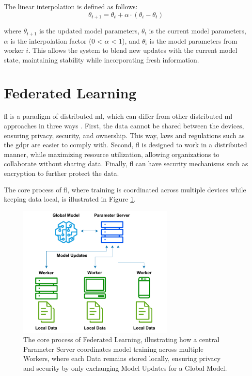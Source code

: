 The linear interpolation is defined as follows:
\begin{equation}
    \theta_{t+1} = \theta_t + \alpha \cdot (\theta_i - \theta_t)
\end{equation}

where $\theta_{t+1}$ is the updated model parameters, $\theta_t$ is the current model parameters, $\alpha$ is the interpolation factor (0 < $\alpha$ < 1), and $\theta_i$ is the model parameters from worker $i$. This allows the system to blend new updates with the current model state, maintaining stability while incorporating fresh information.



\section{Federated Learning}
\label{sec:federated-learning}

\ac{fl} is a paradigm of distributed \ac{ml},  which can differ from other distributed \ac{ml} approaches in three ways \cite{liu2022distributed}. First, the data cannot be shared between the devices, ensuring privacy, security, and ownership. This way, laws and regulations such as the \ac{gdpr} are easier to comply with. Second, \ac{fl} is designed to work in a distributed manner, while maximizing resource utilization, allowing organizations to collaborate without sharing data. Finally, \ac{fl} can have security mechanisms such as encryption to further protect the data.

The core process of \ac{fl}, where training is coordinated across multiple devices while keeping data local, is illustrated in Figure \ref{fig:fl_process}. 

\begin{figure}[!htb]
    \centering
    \includegraphics[width=0.7\textwidth]{figs/fl_process.pdf}
    \caption[Federated Learning Process Overview]{The core process of Federated Learning, illustrating how a central Parameter Server coordinates model training across multiple Workers, where each Data remains stored locally, ensuring privacy and security by only exchanging Model Updates for a Global Model.}
    \label{fig:fl_process}
\end{figure}

